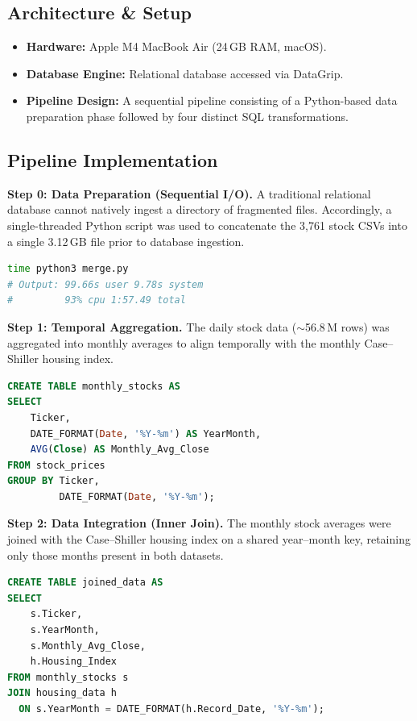 \documentclass[11pt]{article}
\begin{document}
\subsection{Architecture \& Setup}

\begin{itemize}
    \item \textbf{Hardware:} Apple M4 MacBook Air (24\,GB RAM, macOS).
    \item \textbf{Database Engine:} Relational database accessed via DataGrip.
    \item \textbf{Pipeline Design:} A sequential pipeline consisting of a Python-based data preparation phase followed by four distinct SQL transformations.
\end{itemize}

\subsection{Pipeline Implementation}

\textbf{Step 0: Data Preparation (Sequential I/O).}
A traditional relational database cannot natively ingest a directory of fragmented files. Accordingly, a single-threaded Python script was used to concatenate the 3,761 stock CSVs into a single 3.12\,GB file prior to database ingestion.

\begin{lstlisting}[language=bash]
time python3 merge.py
# Output: 99.66s user 9.78s system
#         93% cpu 1:57.49 total
\end{lstlisting}

\textbf{Step 1: Temporal Aggregation.}
The daily stock data (${\sim}$56.8\,M rows) was aggregated into monthly averages to align temporally with the monthly Case--Shiller housing index.

\begin{lstlisting}[language=SQL]
CREATE TABLE monthly_stocks AS
SELECT
    Ticker,
    DATE_FORMAT(Date, '%Y-%m') AS YearMonth,
    AVG(Close) AS Monthly_Avg_Close
FROM stock_prices
GROUP BY Ticker,
         DATE_FORMAT(Date, '%Y-%m');
\end{lstlisting}

\textbf{Step 2: Data Integration (Inner Join).}
The monthly stock averages were joined with the Case--Shiller housing index on a shared year--month key, retaining only those months present in both datasets.

\begin{lstlisting}[language=SQL]
CREATE TABLE joined_data AS
SELECT
    s.Ticker,
    s.YearMonth,
    s.Monthly_Avg_Close,
    h.Housing_Index
FROM monthly_stocks s
JOIN housing_data h
  ON s.YearMonth = DATE_FORMAT(h.Record_Date, '%Y-%m');
\end{lstlisting}
\end{document}
